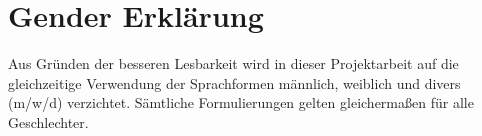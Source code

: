 \thispagestyle{empty}
\section*{\Huge{Gender Erklärung}}

Aus Gründen der besseren Lesbarkeit wird in dieser Projektarbeit auf die gleichzeitige Verwendung der Sprachformen männlich,
weiblich und divers (m/w/d) verzichtet. 
Sämtliche Formulierungen gelten gleichermaßen für alle Geschlechter.
\newpage